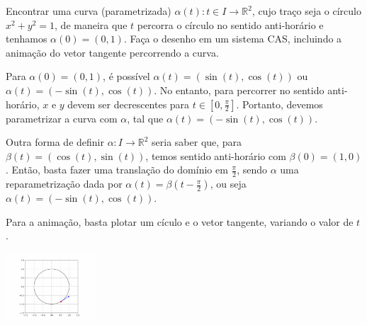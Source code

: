 \documentclass[../main.tex]{subfiles}
\begin{document}
	\begin{exercicio}{2}
		Encontrar uma curva (parametrizada) $\alpha(t)\colon t\in I\to \mathbb{R}^2$, cujo traço seja o círculo $x^2+y^2=1$, de maneira que $t$ percorra o círculo no sentido anti-horário e tenhamos $\alpha(0)=(0,1)$. Faça o desenho em um sistema CAS, incluindo a animação do vetor tangente percorrendo a curva.
	\end{exercicio}
	\begin{solucao}
		Para $\alpha(0)=(0,1)$, é possível $\alpha(t)=(\sin(t),\cos(t))$ ou $\alpha(t)=(-\sin(t), \cos(t))$. No entanto, para percorrer no sentido anti-horário, $x$ e $y$ devem ser decrescentes para $t\in [0,\tfrac{\pi}{2}]$. Portanto, devemos parametrizar a curva com $\alpha$, tal que $\alpha(t)=(-\sin(t), \cos(t))$.
		
		Outra forma de definir $\alpha\colon I\to \mathbb{R}^2$ seria saber que, para $\beta(t)=(\cos(t), \sin(t))$, temos sentido anti-horário com $\beta(0)=(1,0)$. Então, basta fazer uma translação do domínio em $\tfrac{\pi}{2}$, sendo $\alpha$ uma reparametrização dada por $\alpha(t)=\beta(t-\tfrac{\pi}{2})$, ou seja $\alpha(t)=(-\sin(t),\cos(t))$.
		
		Para a animação, basta plotar um cículo e o vetor tangente, variando o valor de $t$.
		
		\begin{center}
			\includegraphics[width=0.25\textwidth]{imagens/lista01/picture_lista01_q02.png}
		\end{center}
	\end{solucao}
	
\end{document}
